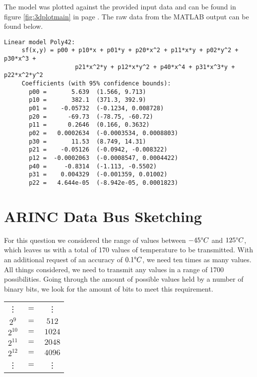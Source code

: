 \documentclass[english,palatino]{ist-report}
\begin{document}
The model was plotted against the provided input data and can be found in figure \ref{fig:3dplotmain} in page \pageref{fig:3dplotmain}. The raw data from the MATLAB output can be found below.  

\begin{verbatim}
Linear model Poly42:
     sf(x,y) = p00 + p10*x + p01*y + p20*x^2 + p11*x*y + p02*y^2 + p30*x^3 + 
                    p21*x^2*y + p12*x*y^2 + p40*x^4 + p31*x^3*y + p22*x^2*y^2
     Coefficients (with 95% confidence bounds):
       p00 =       5.639  (1.566, 9.713)
       p10 =       382.1  (371.3, 392.9)
       p01 =    -0.05732  (-0.1234, 0.008728)
       p20 =      -69.73  (-78.75, -60.72)
       p11 =      0.2646  (0.166, 0.3632)
       p02 =   0.0002634  (-0.0003534, 0.0008803)
       p30 =       11.53  (8.749, 14.31)
       p21 =    -0.05126  (-0.0942, -0.008322)
       p12 =  -0.0002063  (-0.0008547, 0.0004422)
       p40 =     -0.8314  (-1.113, -0.5502)
       p31 =    0.004329  (-0.001359, 0.01002)
       p22 =   4.644e-05  (-8.942e-05, 0.0001823)
\end{verbatim}

\section{ARINC Data Bus Sketching}

For this question we considered the range of values between $\num{-45}\degree C$ and $\num{125}\degree C$, which leaves us with a total of 170 values of temperature to be transmitted. With an additional request of an accuracy of $\num{0.1}\degree C$, we need ten times as many values. All things considered, we need to transmit any values in a range of 1700 possibilities. Going through the amount of possible values held by a number of binary bits, we look for the amount of bits to meet this requirement.

\begin{table}[ht]
	\centering
	\begin{tabular}{ccc}
		\vdots		& $=$	& \vdots	\\
		$2^9$		& $=$	& $512$		\\
		$2^{10}$	& $=$	& $1024$	\\
		$2^{11}$	& $=$	& $2048$	\\
		$2^{12}$	& $=$	& $4096$	\\
		\vdots		& $=$	& \vdots	\\
	\end{tabular}
\end{table}
\end{document}
